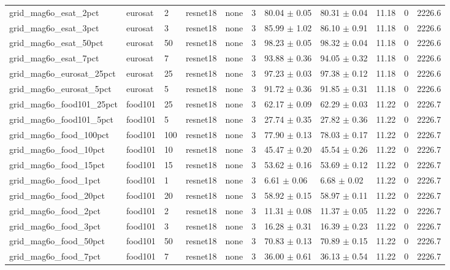 \begin{tabular}{lllllllllll}
grid_mag6o_esat_2pct & eurosat & 2 & resnet18 & none & 3 & 80.04 $\pm$ 0.05 & 80.31 $\pm$ 0.04 & 11.18 & 0 & 2226.6 \\
grid_mag6o_esat_3pct & eurosat & 3 & resnet18 & none & 3 & 85.99 $\pm$ 1.02 & 86.10 $\pm$ 0.91 & 11.18 & 0 & 2226.6 \\
grid_mag6o_esat_50pct & eurosat & 50 & resnet18 & none & 3 & 98.23 $\pm$ 0.05 & 98.32 $\pm$ 0.04 & 11.18 & 0 & 2226.6 \\
grid_mag6o_esat_7pct & eurosat & 7 & resnet18 & none & 3 & 93.88 $\pm$ 0.36 & 94.05 $\pm$ 0.32 & 11.18 & 0 & 2226.6 \\
grid_mag6o_eurosat_25pct & eurosat & 25 & resnet18 & none & 3 & 97.23 $\pm$ 0.03 & 97.38 $\pm$ 0.12 & 11.18 & 0 & 2226.6 \\
grid_mag6o_eurosat_5pct & eurosat & 5 & resnet18 & none & 3 & 91.72 $\pm$ 0.36 & 91.85 $\pm$ 0.31 & 11.18 & 0 & 2226.6 \\
grid_mag6o_food101_25pct & food101 & 25 & resnet18 & none & 3 & 62.17 $\pm$ 0.09 & 62.29 $\pm$ 0.03 & 11.22 & 0 & 2226.7 \\
grid_mag6o_food101_5pct & food101 & 5 & resnet18 & none & 3 & 27.74 $\pm$ 0.35 & 27.82 $\pm$ 0.36 & 11.22 & 0 & 2226.7 \\
grid_mag6o_food_100pct & food101 & 100 & resnet18 & none & 3 & 77.90 $\pm$ 0.13 & 78.03 $\pm$ 0.17 & 11.22 & 0 & 2226.7 \\
grid_mag6o_food_10pct & food101 & 10 & resnet18 & none & 3 & 45.47 $\pm$ 0.20 & 45.54 $\pm$ 0.26 & 11.22 & 0 & 2226.7 \\
grid_mag6o_food_15pct & food101 & 15 & resnet18 & none & 3 & 53.62 $\pm$ 0.16 & 53.69 $\pm$ 0.12 & 11.22 & 0 & 2226.7 \\
grid_mag6o_food_1pct & food101 & 1 & resnet18 & none & 3 & 6.61 $\pm$ 0.06 & 6.68 $\pm$ 0.02 & 11.22 & 0 & 2226.7 \\
grid_mag6o_food_20pct & food101 & 20 & resnet18 & none & 3 & 58.92 $\pm$ 0.15 & 58.97 $\pm$ 0.11 & 11.22 & 0 & 2226.7 \\
grid_mag6o_food_2pct & food101 & 2 & resnet18 & none & 3 & 11.31 $\pm$ 0.08 & 11.37 $\pm$ 0.05 & 11.22 & 0 & 2226.7 \\
grid_mag6o_food_3pct & food101 & 3 & resnet18 & none & 3 & 16.28 $\pm$ 0.31 & 16.39 $\pm$ 0.23 & 11.22 & 0 & 2226.7 \\
grid_mag6o_food_50pct & food101 & 50 & resnet18 & none & 3 & 70.83 $\pm$ 0.13 & 70.89 $\pm$ 0.15 & 11.22 & 0 & 2226.7 \\
grid_mag6o_food_7pct & food101 & 7 & resnet18 & none & 3 & 36.00 $\pm$ 0.61 & 36.13 $\pm$ 0.54 & 11.22 & 0 & 2226.7 \\

\end{tabular}
